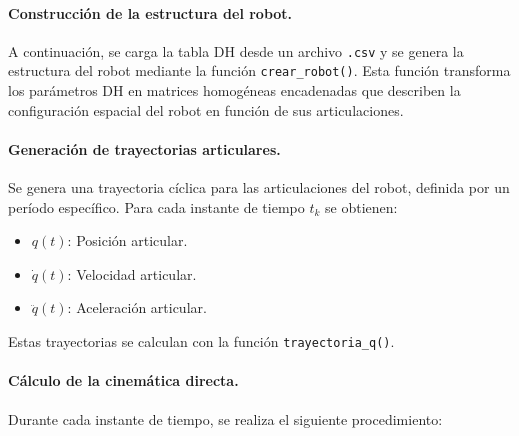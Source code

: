 \paragraph{Construcción de la estructura del robot.}

A continuación, se carga la tabla DH desde un archivo \texttt{.csv} y se genera la estructura del robot mediante la función \texttt{crear\_robot()}. Esta función transforma los parámetros DH en matrices homogéneas encadenadas que describen la configuración espacial del robot en función de sus articulaciones.

\paragraph{Generación de trayectorias articulares.}

Se genera una trayectoria cíclica para las articulaciones del robot, definida por un período específico. Para cada instante de tiempo $t_k$ se obtienen:

\begin{itemize}
	\item $q(t)$: Posición articular.
	\item $\dot{q}(t)$: Velocidad articular.
	\item $\ddot{q}(t)$: Aceleración articular.
\end{itemize}

Estas trayectorias se calculan con la función \texttt{trayectoria\_q()}.

\paragraph{Cálculo de la cinemática directa.}

Durante cada instante de tiempo, se realiza el siguiente procedimiento:

